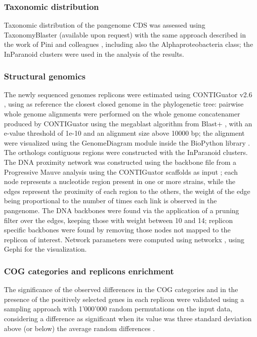 \begin{small}
\subsubsection{Taxonomic distribution}
Taxonomic distribution of the pangenome CDS was assessed using TaxonomyBlaster (available upon request) with the same approach described in the work of Pini and colleagues \cite{pini2011plant}, including also the Alphaproteobacteria class; the InParanoid clusters were used in the analysis of the results.

\subsubsection{Structural genomics}
The newly sequenced genomes replicons were estimated using CONTIGuator v2.6 \cite{galardini2011contiguator}, using as reference the closest closed genome in the phylogenetic tree: pairwise whole genome alignments were performed on the whole genome concatenamer produced by CONTIGuator using the megablast algorithm from Blast+ \cite{camacho2009blast+}, with an e-value threshold of 1e-10 and an alignment size above 10000 bp; the alignment were visualized using the GenomeDiagram \cite{pritchard2006genomediagram} module inside the BioPython library \cite{cock2009biopython}. The orthologs contiguous regions were constructed with the InParanoid clusters. The DNA proximity network was constructed using the backbone file from a Progressive Mauve analysis using the CONTIGuator scaffolds as input \cite{darling2004mauve}; each node represents a nucleotide region present in one or more strains, while the edges represent the proximity of each region to the others, the weight of the edge being proportional to the number of times each link is observed in the pangenome. The DNA backbones were found via the application of a pruning filter over the edges, keeping those with weight between 10 and 14; replicon specific backbones were found by removing those nodes not mapped to the replicon of interest. Network parameters were computed using networkx \cite{hagberg2008exploring}, using Gephi \cite{bastian2009gephi} for the visualization.

\subsubsection{COG categories and replicons enrichment}
The significance of the observed differences in the COG categories and in the presence of the positively selected genes in each replicon were validated using a sampling approach with 1'000'000 random permutations on the input data, considering a difference as significant when its value was three standard deviation above (or below) the average random differences \cite{brilli2010diversity}\cite{galardini2011exploring}.
\end{small}

